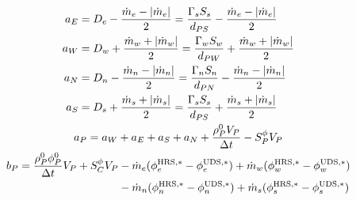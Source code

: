 \begin{gather}
	\begin{align}
		a_E &= D_e - \frac{\dot{m}_e - \abs{\dot{m}_e}}{2} = 
		\frac{\Gamma_s S_s}{d_{PS}} - \frac{\dot{m}_e - \abs{\dot{m}_e}}{2} \\
		a_W &= D_w + \frac{\dot{m}_w + \abs{\dot{m}_w}}{2} =
		\frac{\Gamma_w S_w}{d_{PW}} + \frac{\dot{m}_w + \abs{\dot{m}_w}}{2} \\
		a_N &= D_n - \frac{\dot{m}_n - \abs{\dot{m}_n}}{2} =
		\frac{\Gamma_n S_n}{d_{PN}} - \frac{\dot{m}_n - \abs{\dot{m}_n}}{2} \\
		a_S &= D_s + \frac{\dot{m}_s + \abs{\dot{m}_s}}{2} = 
		\frac{\Gamma_s S_s}{d_{PS}} + \frac{\dot{m}_s + \abs{\dot{m}_s}}{2}
	\end{align} \\
	a_P = a_W + a_E + a_S + a_N + \frac{\rho_P^0 V_P}{\Delta t} - S_P^\phi V_P \\
	\begin{align}
		b_P = \frac{\rho_P^0 \phi_P^0}{\Delta t} V_P + S_C^\phi V_P 
		&- \dot{m}_e (\phi_e^{\text{HRS},\ast} - \phi_e^{\text{UDS},\ast}) 
		+ \dot{m}_w (\phi_w^{\text{HRS},\ast} - \phi_w^{\text{UDS},\ast}) \nonumber \\
		&- \dot{m}_n (\phi_n^{\text{HRS},\ast} - \phi_n^{\text{UDS},\ast}) 
		+ \dot{m}_s (\phi_s^{\text{HRS},\ast} - \phi_s^{\text{UDS},\ast})
	\end{align}
\end{gather}





